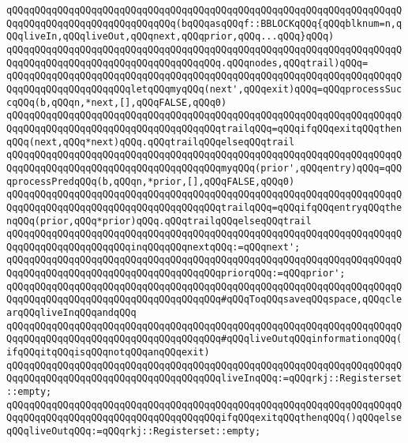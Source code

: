 \verb|qQQqqQQqqQQqqQQqqQQqqQQqqQQqqQQqqQQqqQQqqQQqqQQqqQQqqQQqqQQqqQQqqQQqqQQqqQQqqQQqqQQqqQQqqQQqqQQqqQQq(bqQQqasqQQqf::BBLOCKqQQq{qQQqblknum=n,qQQqliveIn,qQQqliveOut,qQQqnext,qQQqprior,qQQq...qQQq}qQQq)|\newline
\verb|qQQqqQQqqQQqqQQqqQQqqQQqqQQqqQQqqQQqqQQqqQQqqQQqqQQqqQQqqQQqqQQqqQQqqQQqqQQqqQQqqQQqqQQqqQQqqQQqqQQqqQQqqQQq.qQQqnodes,qQQqtrail)qQQq=|\newline
\verb|qQQqqQQqqQQqqQQqqQQqqQQqqQQqqQQqqQQqqQQqqQQqqQQqqQQqqQQqqQQqqQQqqQQqqQQqqQQqqQQqqQQqqQQqqQQqletqQQqmyqQQq(next',qQQqexit)qQQq=qQQqprocessSuccqQQq(b,qQQqn,*next,[],qQQqFALSE,qQQq0)|\newline
\verb|qQQqqQQqqQQqqQQqqQQqqQQqqQQqqQQqqQQqqQQqqQQqqQQqqQQqqQQqqQQqqQQqqQQqqQQqqQQqqQQqqQQqqQQqqQQqqQQqqQQqqQQqqQQqtrailqQQq=qQQqifqQQqexitqQQqthenqQQq(next,qQQq*next)qQQq.qQQqtrailqQQqelseqQQqtrail|\newline
\verb|qQQqqQQqqQQqqQQqqQQqqQQqqQQqqQQqqQQqqQQqqQQqqQQqqQQqqQQqqQQqqQQqqQQqqQQqqQQqqQQqqQQqqQQqqQQqqQQqqQQqqQQqqQQqmyqQQq(prior',qQQqentry)qQQq=qQQqprocessPredqQQq(b,qQQqn,*prior,[],qQQqFALSE,qQQq0)|\newline
\verb|qQQqqQQqqQQqqQQqqQQqqQQqqQQqqQQqqQQqqQQqqQQqqQQqqQQqqQQqqQQqqQQqqQQqqQQqqQQqqQQqqQQqqQQqqQQqqQQqqQQqqQQqqQQqtrailqQQq=qQQqifqQQqentryqQQqthenqQQq(prior,qQQq*prior)qQQq.qQQqtrailqQQqelseqQQqtrail|\newline
\verb|qQQqqQQqqQQqqQQqqQQqqQQqqQQqqQQqqQQqqQQqqQQqqQQqqQQqqQQqqQQqqQQqqQQqqQQqqQQqqQQqqQQqqQQqqQQqinqQQqqQQqnextqQQq:=qQQqnext';|\newline
\verb|qQQqqQQqqQQqqQQqqQQqqQQqqQQqqQQqqQQqqQQqqQQqqQQqqQQqqQQqqQQqqQQqqQQqqQQqqQQqqQQqqQQqqQQqqQQqqQQqqQQqqQQqqQQqpriorqQQq:=qQQqprior';|\newline
\verb|qQQqqQQqqQQqqQQqqQQqqQQqqQQqqQQqqQQqqQQqqQQqqQQqqQQqqQQqqQQqqQQqqQQqqQQqqQQqqQQqqQQqqQQqqQQqqQQqqQQqqQQqqQQq#qQQqToqQQqsaveqQQqspace,qQQqclearqQQqliveInqQQqandqQQq|\newline
\verb|qQQqqQQqqQQqqQQqqQQqqQQqqQQqqQQqqQQqqQQqqQQqqQQqqQQqqQQqqQQqqQQqqQQqqQQqqQQqqQQqqQQqqQQqqQQqqQQqqQQqqQQqqQQq#qQQqliveOutqQQqinformationqQQq(ifqQQqitqQQqisqQQqnotqQQqanqQQqexit)|\newline
\newline
\verb|qQQqqQQqqQQqqQQqqQQqqQQqqQQqqQQqqQQqqQQqqQQqqQQqqQQqqQQqqQQqqQQqqQQqqQQqqQQqqQQqqQQqqQQqqQQqqQQqqQQqqQQqqQQqliveInqQQq:=qQQqrkj::Registerset::empty;|\newline
\verb|qQQqqQQqqQQqqQQqqQQqqQQqqQQqqQQqqQQqqQQqqQQqqQQqqQQqqQQqqQQqqQQqqQQqqQQqqQQqqQQqqQQqqQQqqQQqqQQqqQQqqQQqqQQqifqQQqexitqQQqthenqQQq()qQQqelseqQQqliveOutqQQq:=qQQqrkj::Registerset::empty;|\newline
